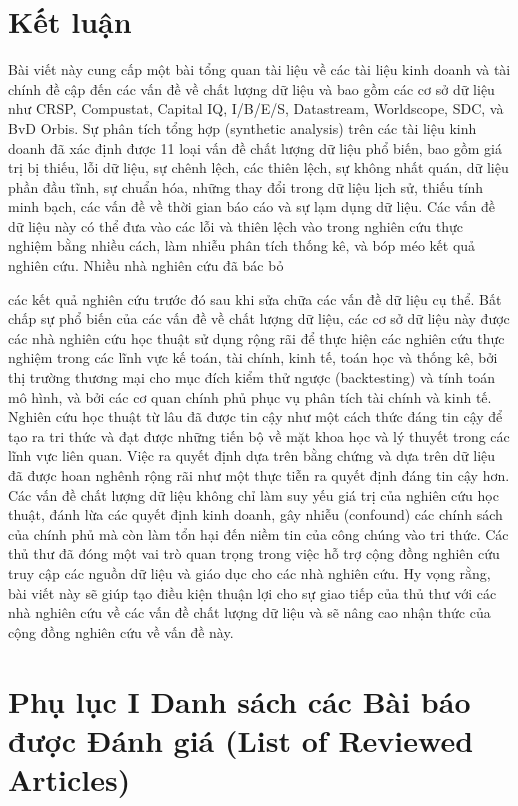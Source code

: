 \section{Kết luận}

Bài viết này cung cấp một bài tổng quan tài liệu về các tài liệu kinh doanh và tài chính đề cập đến các vấn đề về chất lượng dữ liệu và bao gồm các cơ sở dữ liệu như CRSP, Compustat, Capital IQ, I/B/E/S, Datastream, Worldscope, SDC, và BvD Orbis. Sự phân tích tổng hợp (synthetic analysis) trên các tài liệu kinh doanh đã xác định được 11 loại vấn đề chất lượng dữ liệu phổ biến, bao gồm giá trị bị thiếu, lỗi dữ liệu, sự chênh lệch, các thiên lệch, sự không nhất quán, dữ liệu phần đầu tĩnh, sự chuẩn hóa, những thay đổi trong dữ liệu lịch sử, thiếu tính minh bạch, các vấn đề về thời gian báo cáo và sự lạm dụng dữ liệu. Các vấn đề dữ liệu này có thể đưa vào các lỗi và thiên lệch vào trong nghiên cứu thực nghiệm bằng nhiều cách, làm nhiễu phân tích thống kê, và bóp méo kết quả nghiên cứu. Nhiều nhà nghiên cứu đã bác bỏ

các kết quả nghiên cứu trước đó sau khi sửa chữa các vấn đề dữ liệu cụ thể. Bất chấp sự phổ biến của các vấn đề về chất lượng dữ liệu, các cơ sở dữ liệu này được các nhà nghiên cứu học thuật sử dụng rộng rãi để thực hiện các nghiên cứu thực nghiệm trong các lĩnh vực kế toán, tài chính, kinh tế, toán học và thống kê, bởi thị trường thương mại cho mục đích kiểm thử ngược (backtesting) và tính toán mô hình, và bởi các cơ quan chính phủ phục vụ phân tích tài chính và kinh tế. Nghiên cứu học thuật từ lâu đã được tin cậy như một cách thức đáng tin cậy để tạo ra tri thức và đạt được những tiến bộ về mặt khoa học và lý thuyết trong các lĩnh vực liên quan. Việc ra quyết định dựa trên bằng chứng và dựa trên dữ liệu đã được hoan nghênh rộng rãi như một thực tiễn ra quyết định đáng tin cậy hơn. Các vấn đề chất lượng dữ liệu không chỉ làm suy yếu giá trị của nghiên cứu học thuật, đánh lừa các quyết định kinh doanh, gây nhiễu (confound) các chính sách của chính phủ mà còn làm tổn hại đến niềm tin của công chúng vào tri thức. Các thủ thư đã đóng một vai trò quan trọng trong việc hỗ trợ cộng đồng nghiên cứu truy cập các nguồn dữ liệu và giáo dục cho các nhà nghiên cứu. Hy vọng rằng, bài viết này sẽ giúp tạo điều kiện thuận lợi cho sự giao tiếp của thủ thư với các nhà nghiên cứu về các vấn đề chất lượng dữ liệu và sẽ nâng cao nhận thức của cộng đồng nghiên cứu về vấn đề này.

\section{Phụ lục I Danh sách các Bài báo được Đánh giá (List of Reviewed Articles)}

